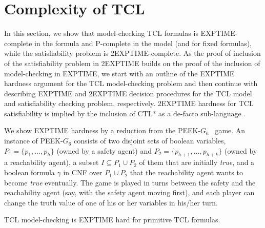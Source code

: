 \section{Complexity of TCL\label{sec.gen.proc}} 

In this section, we show that model-checking TCL formulas is EXPTIME-complete in the formula and P-complete in the model (and for fixed formulas), while the satisfiability problem is 2EXPTIME-complete.
As the proof of inclusion of the satisfiability problem in 2EXPTIME builds on the proof of the inclusion of model-checking in EXPTIME, we start with an outline of the EXPTIME hardness argument for the TCL model-checking problem and then continue with describing EXPTIME and 2EXPTIME decision procedures for the TCL model and satisfiability checking problem, respectively.
2EXPTIME hardness for TCL satisfiability is implied by the inclusion of CTL* as a de-facto sub-language \cite{Vardi+Stockmeyer/85/CTL}.



We show EXPTIME hardness by a reduction from 
the {\sf PEEK-$G_6$}~\cite{SC79} game.
An instance of {\sf PEEK-$G_6$} consists of 
two disjoint sets of boolean variables, 
$P_1=\{p_1,\ldots,p_h\}$ (owned by a safety agent) and 
$P_2=\{p_{h+1},\ldots,p_{h+k}\}$ (owned by a reachability agent), 
a subset $I\subseteq P_1\cup P_2$ of them that are initially {\em true}, 
and a boolean formula $\gamma$ in CNF over 
$P_1\cup P_2$ that the reachability agent wants to become 
{\em true} eventually.
The game is played in turns between the safety and the reachability agent 
(say, with the safety agent moving first), and 
each player can change the truth value of one of his or her variables 
in his/her turn.

\begin{lemma}
\label{lemma.exptime.hard}
TCL model-checking is EXPTIME hard for primitive TCL formulas.
\end{lemma}

